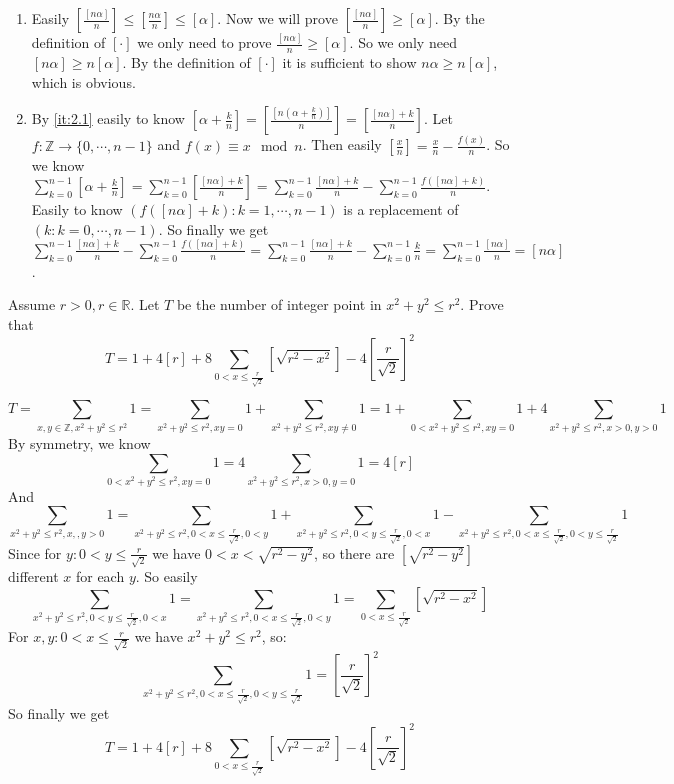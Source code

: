 \documentclass{ctexart}
\begin{document}
\begin{solution}
  \begin{enumerate}
    \item \label{it:2.1} Easily \(\left[\frac{[n \alpha]}{n}\right]\leq\left[\frac{n \alpha}{n}\right] \leq[\alpha]\).
      Now we will prove \(\left[\frac{[n \alpha]}{n}\right]\geq [\alpha]\).
      By the definition of \([\cdot]\) we only need to prove \(\frac{[n \alpha]}{n}\geq [\alpha]\).
      So we only need \([n \alpha]\geq n [\alpha]\).
      By the definition of \([\cdot]\) it is sufficient to show \(n \alpha \geq n[\alpha]\), which is obvious.
    \item By \ref{it:2.1} easily to know \([\alpha+\frac{k}{n}]=\left[\frac{[n(\alpha+\frac{k}{n})]}{n}\right]=
      \left[\frac{[n \alpha]+k}{n}\right]\).
      Let \(f:\mathbb{Z} \to \{0,\cdots,n-1\}\) and \(f(x)\equiv x \mod n\).
      Then easily \([\frac{x}{n}]=\frac{x}{n}-\frac{f(x)}{n}\).
      So we know \(\sum_{k=0}^{n-1}[\alpha+\frac{k}{n}]=\sum_{k=0}^{n-1}[\frac{[n \alpha]+k}{n}]=
      \sum_{k=0}^{n-1}\frac{[n \alpha]+k}{n}-\sum_{k=0}^{n-1}\frac{f([n \alpha]+k)}{n}\).
      Easily to know \((f([n \alpha]+k):k=1,\cdots,n-1)\) is a replacement of \((k:k=0,\cdots,n-1)\).
      So finally we get \(\sum_{k=0}^{n-1}\frac{[n \alpha]+k}{n}-\sum_{k=0}^{n-1}\frac{f([n \alpha]+k)}{n}=\sum_{k=0}^{n-1}\frac{[n \alpha]+k}{n}-\sum_{k=0}^{n-1}\frac{k}{n}=\sum_{k=0}^{n-1}\frac{[n \alpha]}{n}=[n \alpha]\).
  \end{enumerate}
\end{solution}
\begin{problem}\label{pro:p16.4.3}
  Assume \(r>0,r \in \mathbb{R}\). Let \(T\) be the number of integer point in  \(x^2 + y^2 \leq r^2\).
  Prove that
  \[
    T = 1 + 4[r] + 8 \sum_{0<x \leq \frac{r}{\sqrt{2}}}[\sqrt{r^2-x^2}] -4\left[\frac{r}{\sqrt{2}}\right]^2
  \]
\end{problem}
\begin{solution}
  \[
    T=\sum_{x,y \in \mathbb{Z},x^2 + y^2 \leq r^2}1=\sum_{x^2 + y^2 \leq r^2,xy=0} 1 +\sum_{x^2+y^2 \leq r^2,xy \neq 0} 1=
    1+\sum_{0<x^2 + y^2 \leq r^2,xy=0} 1 +4 \sum_{x^2 + y^2 \leq r^2,x>0,y>0} 1
  \]
  By symmetry, we know
  \[
    \sum_{0<x^2 + y^2 \leq r^2,xy=0} 1 =4\sum_{x^2 + y^2 \leq r^2,x >0,y=0} 1=4[r]
  \]
  And
  \[
    \sum_{x^2 + y^2 \leq r^2,x,,y>0} 1 =\sum_{x^2+y^2 \leq r^2,0<x \leq \frac{r}{\sqrt{2}},0<y} 1 + \sum_{x^2+y^2 \leq r^2,0<y \leq \frac{r}{\sqrt{2}},0<x} 1 -\sum_{x^2+y^2 \leq r^2,0<x \leq \frac{r}{\sqrt{2}},0<y \leq \frac{r}{\sqrt{2}}} 1
  \]
  Since for \(y:0<y \leq \frac{r}{\sqrt{2}}\) we have \(0<x<\sqrt{r^2-y^2}\), so there are \([\sqrt{r^2-y^2}]\) different \(x\) for each \(y\).
  So easily
  \[
    \sum_{x^2+y^2 \leq r^2,0<y \leq \frac{r}{\sqrt{2}},0<x} 1 =\sum_{x^2+y^2 \leq r^2,0<x \leq \frac{r}{\sqrt{2}},0<y} 1 =\sum_{0<x \leq \frac{r}{\sqrt{2}}}[\sqrt{r^2-x^2}]
  \]
  For \(x,y:0<x \leq \frac{r}{\sqrt{2}}\) we have \(x^2+y^2 \leq r^2\), so:
  \[
    \sum_{x^2+y^2 \leq r^2,0<x \leq \frac{r}{\sqrt{2}},0<y \leq \frac{r}{\sqrt{2}}} 1=\left[\frac{r}{\sqrt{2}}\right]^2
  \]
  So finally we get
  \[
    T = 1 + 4[r] + 8 \sum_{0<x \leq \frac{r}{\sqrt{2}}}[\sqrt{r^2-x^2}] -4\left[\frac{r}{\sqrt{2}}\right]^2
  \]
\end{solution}
\end{document}
